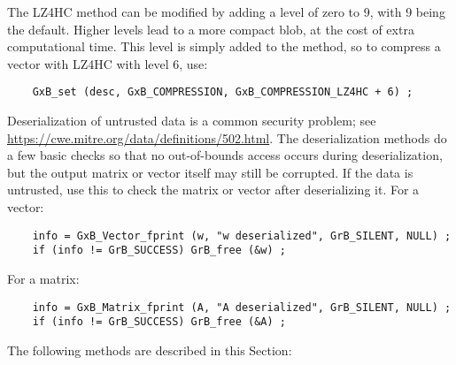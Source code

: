 \documentclass[12pt]{article}
\begin{document}
The LZ4HC method can be modified by adding a level of zero to 9, with 9 being
the default.  Higher levels lead to a more compact blob, at the cost of extra
computational time. This level is simply added to the method, so to compress a
vector with LZ4HC with level 6, use:

    {\footnotesize
    \begin{verbatim}
    GxB_set (desc, GxB_COMPRESSION, GxB_COMPRESSION_LZ4HC + 6) ; \end{verbatim}}

Deserialization of untrusted data is a common security problem; see
\url{https://cwe.mitre.org/data/definitions/502.html}. The deserialization methods
do a few basic checks so that no out-of-bounds access occurs during
deserialization, but the output matrix or vector itself may still be corrupted.  If
the data is untrusted, use this to check the matrix or vector
after deserializing it.  For a vector:

{\footnotesize
\begin{verbatim}
    info = GxB_Vector_fprint (w, "w deserialized", GrB_SILENT, NULL) ;
    if (info != GrB_SUCCESS) GrB_free (&w) ; \end{verbatim}}

For a matrix:

{\footnotesize
\begin{verbatim}
    info = GxB_Matrix_fprint (A, "A deserialized", GrB_SILENT, NULL) ;
    if (info != GrB_SUCCESS) GrB_free (&A) ; \end{verbatim}}

The following methods are described in this Section:
\end{document}

